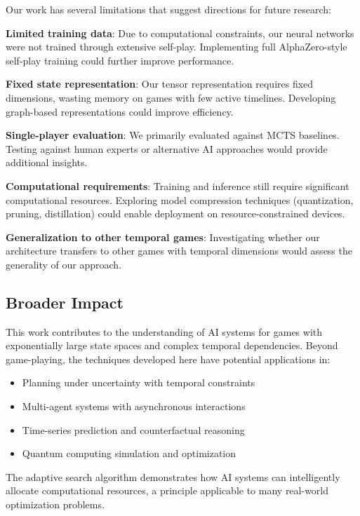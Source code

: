 \documentclass{article}
\begin{document}
Our work has several limitations that suggest directions for future research:

\textbf{Limited training data}: Due to computational constraints, our neural networks were not trained through extensive self-play. Implementing full AlphaZero-style self-play training could further improve performance.

\textbf{Fixed state representation}: Our tensor representation requires fixed dimensions, wasting memory on games with few active timelines. Developing graph-based representations could improve efficiency.

\textbf{Single-player evaluation}: We primarily evaluated against MCTS baselines. Testing against human experts or alternative AI approaches would provide additional insights.

\textbf{Computational requirements}: Training and inference still require significant computational resources. Exploring model compression techniques (quantization, pruning, distillation) could enable deployment on resource-constrained devices.

\textbf{Generalization to other temporal games}: Investigating whether our architecture transfers to other games with temporal dimensions would assess the generality of our approach.

\subsection{Broader Impact}

This work contributes to the understanding of AI systems for games with exponentially large state spaces and complex temporal dependencies. Beyond game-playing, the techniques developed here have potential applications in:

\begin{itemize}
    \item Planning under uncertainty with temporal constraints
    \item Multi-agent systems with asynchronous interactions
    \item Time-series prediction and counterfactual reasoning
    \item Quantum computing simulation and optimization
\end{itemize}

The adaptive search algorithm demonstrates how AI systems can intelligently allocate computational resources, a principle applicable to many real-world optimization problems.
\end{document}
